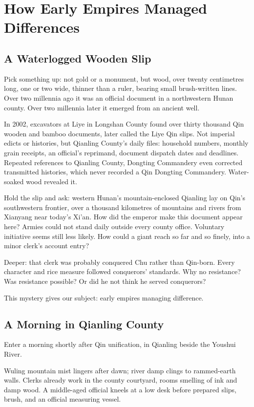 \chapter[Early Empires and Difference]{How Early Empires Managed Differences}
\section{A Waterlogged Wooden Slip}
Pick something up: not gold or a monument, but wood, over twenty centimetres long, one or two wide, thinner than a ruler, bearing small brush-written lines. Over two millennia ago it was an official document in a northwestern Hunan county. Over two millennia later it emerged from an ancient well.

In 2002, excavators at Liye in Longshan County found over thirty thousand Qin wooden and bamboo documents, later called the Liye Qin slips. Not imperial edicts or histories, but Qianling County's daily files: household numbers, monthly grain receipts, an official's reprimand, document dispatch dates and deadlines. Repeated references to Qianling County, Dongting Commandery even corrected transmitted histories, which never recorded a Qin Dongting Commandery. Water-soaked wood revealed it.

Hold the slip and ask: western Hunan's mountain-enclosed Qianling lay on Qin's southwestern frontier, over a thousand kilometres of mountains and rivers from Xianyang near today's Xi'an. How did the emperor make this document appear here? Armies could not stand daily outside every county office. Voluntary initiative seems still less likely. How could a giant reach so far and so finely, into a minor clerk's account entry?

Deeper: that clerk was probably conquered Chu rather than Qin-born. Every character and rice measure followed conquerors' standards. Why no resistance? Was resistance possible? Or did he not think he served conquerors?

This mystery gives our subject: early empires managing difference.

\section{A Morning in Qianling County}
Enter a morning shortly after Qin unification, in Qianling beside the Youshui River.

Wuling mountain mist lingers after dawn; river damp clings to rammed-earth walls. Clerks already work in the county courtyard, rooms smelling of ink and damp wood. A middle-aged official kneels at a low desk before prepared slips, brush, and an official measuring vessel.

